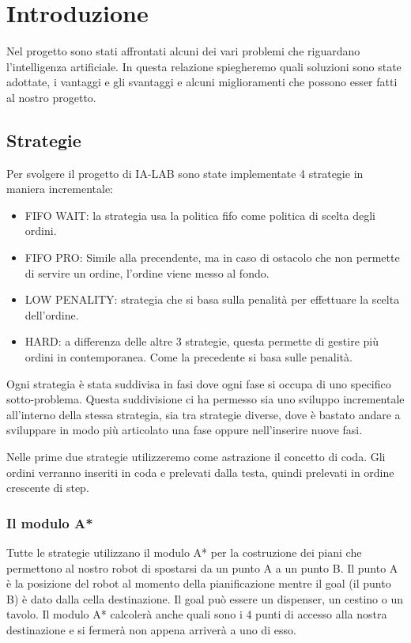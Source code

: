 \chapter{Introduzione}
Nel progetto sono stati affrontati alcuni dei vari problemi che riguardano l'intelligenza artificiale. In questa relazione spiegheremo quali soluzioni sono state adottate, i vantaggi e gli svantaggi e alcuni miglioramenti che possono esser fatti al nostro progetto.

\section{Strategie}
Per svolgere il progetto di IA-LAB sono state implementate 4 strategie in maniera incrementale:
\begin{itemize}
  \item FIFO WAIT: la strategia usa la politica fifo come politica di scelta degli ordini.
  \item FIFO PRO: Simile alla precendente, ma in caso di ostacolo che non permette di servire un ordine, l'ordine viene messo al fondo.
  \item LOW PENALITY: strategia che si basa sulla penalità per effettuare la scelta dell'ordine.
  \item HARD: a differenza delle altre 3 strategie, questa permette di gestire più ordini in contemporanea. Come la precedente si basa sulle penalità.
\end{itemize}

Ogni strategia è stata suddivisa in fasi dove ogni fase si occupa di uno specifico sotto-problema. Questa suddivisione ci ha permesso sia uno sviluppo incrementale all'interno della stessa strategia, sia tra strategie diverse, dove è bastato andare a sviluppare in modo più articolato una fase oppure nell'inserire nuove fasi.

Nelle prime due strategie utilizzeremo come astrazione il concetto di coda. Gli ordini verranno inseriti in coda e prelevati dalla testa, quindi prelevati in ordine crescente di step.

\subsection{Il modulo A*}
\label{sec:modulo_astar}
Tutte le strategie utilizzano il modulo A* per la costruzione dei piani che permettono al nostro robot di spostarsi da un punto A a un punto B. Il punto A è la posizione del robot al momento della pianificazione mentre il goal (il punto B) è dato dalla cella destinazione. Il goal può essere un dispenser, un cestino o un tavolo. Il modulo A* calcolerà anche quali sono i 4 punti di accesso alla nostra destinazione e si fermerà non appena arriverà a uno di esso.

